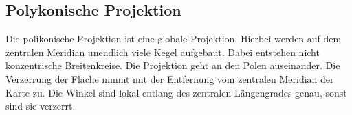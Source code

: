 \subsection{Polykonische Projektion}
\label{sec:polikonisch}
Die polikonische Projektion ist eine globale Projektion. Hierbei werden auf dem zentralen Meridian unendlich viele Kegel aufgebaut. Dabei entstehen nicht konzentrische Breitenkreise. Die Projektion geht an den Polen auseinander. Die Verzerrung der Fläche nimmt mit der Entfernung vom zentralen Meridian der Karte zu. Die Winkel sind lokal entlang des zentralen Längengrades genau, sonst sind sie verzerrt.
